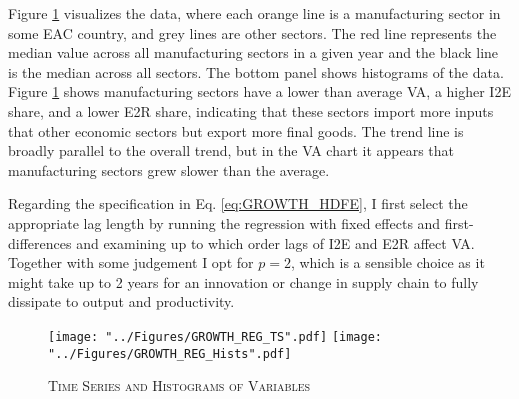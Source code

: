 \documentclass[a4paper]{article}
\begin{document}
 Figure \ref{fig:GROWTH_REG_TS} visualizes the data, where each orange line is a manufacturing sector in some EAC country, and grey lines are other sectors. The red line represents the median value across all manufacturing sectors in a given year and the black line is the median across all sectors. The bottom panel shows histograms of the data. Figure \ref{fig:GROWTH_REG_TS} shows manufacturing sectors have a lower than average VA, a higher I2E share, and a lower E2R share, indicating that these sectors import more inputs that other economic sectors but export more final goods. The trend line is broadly parallel to the overall trend, but in the VA chart it appears that manufacturing sectors grew slower than the average. \newline %

Regarding the specification in Eq. \ref{eq:GROWTH_HDFE}, I first select the appropriate lag length by running the regression with fixed effects and first-differences and examining up to which order lags of I2E and E2R affect VA. Together with some judgement I opt for $p = 2$, which is a sensible choice as it might take up to 2 years for an innovation or change in supply chain to fully dissipate to output and productivity.

\begin{figure}[h!]
\centering
\caption{\label{fig:GROWTH_REG_TS}\textsc{Time Series and Histograms of Variables}}
\texttt{[image: "../Figures/GROWTH\_REG\_TS".pdf]}
\texttt{[image: "../Figures/GROWTH\_REG\_Hists".pdf]} %
\end{figure}
\FloatBarrier


\end{document}
